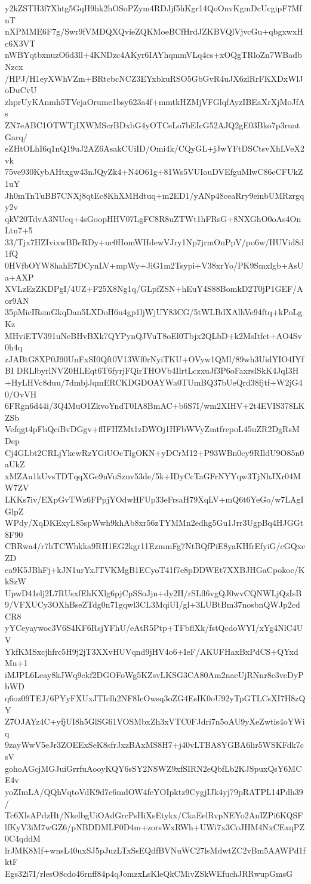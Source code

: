 y2kZSTH3f7Xhtg5GqH9hk2hOSoPZym4RDJjf5hKgr14QoOnvKgmDcUcgipF7MfnT
nXPMME6F7g/Swr9fVMDQXQvieZQKMoeBCfHrdJZKBVQlVjvcGu+qbgxwxHc6X3VT
nWBYqtbxnuzO6d3ll+4KNDzc4AKyr6IAYhqmmVLq4cs+xOQgTRloZn7WBadbNzcx
/HPJ/H1eyXWhVZm+BRtcbcNCZ3EYxbkuRSO5GbGvR4uJX6zlRrFKXDxWlJoDuCvU
zhprUyKAnmh5TVejaOrume1bsy623a4f+mmtkHZMjVFGlqfAyzIBEaXrXjMoJfAs
ZN7eABC1OTWTjIXWMScrBDxbG4yOTCeLo7bEIcG52AJQ2gE03Bko7p3ruatGarq/
eZHtOLhI6q1nQ19uJ2AZ6AsakCUiID/Omi4k/CQyGL+jJwYFtDSCtsvXhLVeX2vk
75ve930KybAHtxgw43nJQyZk4+N4O61g+81Ws5VUIouDVEfguMlwC86eCFUkZ1uY
Jh0mTnTuBB7CNXj8qtEc8KhXMHdtuq+m2ED1/yANp48ceaRry9einbUMRzrgqy2v
qkV20TdvA3NUcq+4sGoopHHV07LgFC8R8uZTWt1hFRsG+8NXGhO0oAs4OnLtn7+5
33/Tjx7HZIvixwBBcRDy+uc0HomWHdewVJry1Np7jrmOnPpV/po6w/HUVid8d1fQ
0HVfbOYW8hahE7DCynLV+mpWy+JiG1m2Tsypi+V38xrYo/PK9Smxlgb+AsUa+AXP
XVLzEzZKDPgI/4UZ+F25X8Ng1q/GLpfZSN+hEuY4S88BomkD2T0jP1GEF/Aor9AN
35pMicIRsmGkqDan5LXDoH6u4gp1ljWjUY83CG/5tWLBdXAlhVe94ftq+kPoLgKz
MHviETV391uNeBHvBXk7QYPynQJVuT8oEl0Tbjx2QLbD+k2MsItfct+AO4Sv0h4q
zJABtG8XP0J90UnFxSI0Qft0V13Wf0rNyiTKU+OVyw1QMl/89wh3UidYIO4IYfBI
DRLlbyrlNVZ0HLEqt6T6fyrjFQirTHOVb4IlrtLczxuJf3P6oFaxrslSkK4JqI3H
+HyLHVc8duu/7dmbjJqmERCKDGDOAYWa0TUmBQ37bUeQrd38fjtf+W2jG40/OvVH
6FRgn6d44i/3Q4MuO1ZkvoYndT0IA8BmAC+b6S7I/wm2XIHV+2t4EVIS378LKZSb
Vefqgt4pFhQciBvDGgv+ffIFHZMt1zDWOj1HFbWVyZmtfrepoL45uZR2DgRsMDep
Cj4GLbt2CRLjYkewRzYGiUOcTlgOKN+yDCrM12+P93WBn0cy9RIldU9O85n0aUkZ
xMZAu1kUvsTDTqqXGe9nVuSznv53de/5k+IDyCcTaGFrNYYqw3TjNhJXr04MW7ZV
LKKs7iv/EXpGvTWz6FPpjYOdwHFUp33eFrsaH79XqLV+mQ6t6YeGo/w7LAgIGlpZ
WPdy/XqDKExyL85spWwh9khAb8xr56zTYMMn2edhg5Gu1Jrr3UgpBq4HJGGt8F90
CBRwa4/r7hTCWhkka9RH1EG2kgr11EzmmFg7NtBQfPiE8yaKHfrEfyiG/cGQxcZD
ea9K5JBhFj+kJN1urYxJTVKMgB1ECyoT41f7e8pDDWEt7XXBJHGaCpokoc/KkSzW
UpwD41elj2L7RUsxfEhKXlg6pjCpSSoJjn+dy2H/rSLfl6vgQJ0wvCQNWLjQzIsB
9/VFXUCy3OXhBseZTdg0n71gqwl3CL3MqiUI/gl+3LUBtBm37nosbnQWJp2cdCR8
yYCeyaywoc3V6S4KF6RsjYFhU/eAtR5Ptp+TFbflXk/fstQcdoWYI/xYg4NlC4UV
YkfKMSxcjhfrc5H9j2jT3XXvHUVqnd9jHV4o6+IeF/AKUFHaxBxPdCS+QYxdMu+1
iMJPL6Leay8kJWq9ekf2DGOFoWg5KZsvLKSG3CA80Am2naeUjRNnr8c3veDyPbWD
q6oz09TEJ/6PYyFXUxJTIclh2NF8IcOwsq3oZG4EsIK0oU92yTpGTLCsXI7H8zQY
Z7OJAYz4C+yfjUI8h5GlSG61VOSMbxZh3xVTC0FJdri7n5oAU9yXeZwtis4oYWiq
9zayWwV5eJr3ZOEExSeK8sfrJxzBAxMS8H7+j40vLTBA8YGBA6lir5WSKFdk7csV
gohoAGcjMGJuiGrrfuAooyKQY6sSY2NSWZ9xfSIRN2eQbfLb2KJSpuxQsY6MCE4v
yoZImLA/QQhVqtoVdK9d7e6mdOW4feYOIpktz9CygjIJk4yj79pRATPL14Pdh39/
Tc6XlsAPdzHt/NkelbgUiOAdGrcPsHiXsEtykx/CkaEelRvpNEYo2AnIZPi6KQSF
lfKyV3iM7wGZ6/pNBDDMLF0D4m+zorsWxRWh+UWi7x3CoJHM4NxCExqPZ0C4qddM
lrJMK8Mf+wnsL40uxSJ5pJuzLTxSsEQdfBVNuWC27lsMdwtZC2vBm5AAWPd1fktF
Egs32i7I/rlesO8cdo46rnff84p4qJomzxLsKleQkCMivZSkWEfuchJRRwupGmsG
